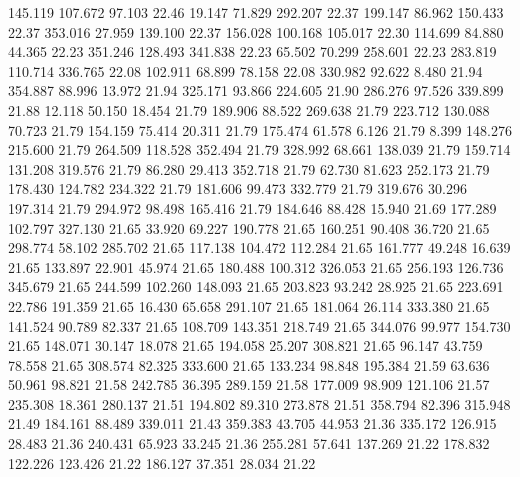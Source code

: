  145.119  107.672   97.103        22.46
  19.147   71.829  292.207        22.37
 199.147   86.962  150.433        22.37
 353.016   27.959  139.100        22.37
 156.028  100.168  105.017        22.30
 114.699   84.880   44.365        22.23
 351.246  128.493  341.838        22.23
  65.502   70.299  258.601        22.23
 283.819  110.714  336.765        22.08
 102.911   68.899   78.158        22.08
 330.982   92.622    8.480        21.94
 354.887   88.996   13.972        21.94
 325.171   93.866  224.605        21.90
 286.276   97.526  339.899        21.88
  12.118   50.150   18.454        21.79
 189.906   88.522  269.638        21.79
 223.712  130.088   70.723        21.79
 154.159   75.414   20.311        21.79
 175.474   61.578    6.126        21.79
   8.399  148.276  215.600        21.79
 264.509  118.528  352.494        21.79
 328.992   68.661  138.039        21.79
 159.714  131.208  319.576        21.79
  86.280   29.413  352.718        21.79
  62.730   81.623  252.173        21.79
 178.430  124.782  234.322        21.79
 181.606   99.473  332.779        21.79
 319.676   30.296  197.314        21.79
 294.972   98.498  165.416        21.79
 184.646   88.428   15.940        21.69
 177.289  102.797  327.130        21.65
  33.920   69.227  190.778        21.65
 160.251   90.408   36.720        21.65
 298.774   58.102  285.702        21.65
 117.138  104.472  112.284        21.65
 161.777   49.248   16.639        21.65
 133.897   22.901   45.974        21.65
 180.488  100.312  326.053        21.65
 256.193  126.736  345.679        21.65
 244.599  102.260  148.093        21.65
 203.823   93.242   28.925        21.65
 223.691   22.786  191.359        21.65
  16.430   65.658  291.107        21.65
 181.064   26.114  333.380        21.65
 141.524   90.789   82.337        21.65
 108.709  143.351  218.749        21.65
 344.076   99.977  154.730        21.65
 148.071   30.147   18.078        21.65
 194.058   25.207  308.821        21.65
  96.147   43.759   78.558        21.65
 308.574   82.325  333.600        21.65
 133.234   98.848  195.384        21.59
  63.636   50.961   98.821        21.58
 242.785   36.395  289.159        21.58
 177.009   98.909  121.106        21.57
 235.308   18.361  280.137        21.51
 194.802   89.310  273.878        21.51
 358.794   82.396  315.948        21.49
 184.161   88.489  339.011        21.43
 359.383   43.705   44.953        21.36
 335.172  126.915   28.483        21.36
 240.431   65.923   33.245        21.36
 255.281   57.641  137.269        21.22
 178.832  122.226  123.426        21.22
 186.127   37.351   28.034        21.22
